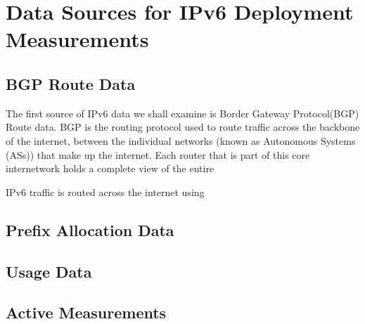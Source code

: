 \section{Data Sources for IPv6 Deployment Measurements}

\subsection{BGP Route Data}

The first source of IPv6 data we shall examine is Border Gateway Protocol(BGP)
Route data. BGP is the routing protocol used to route traffic across the backbone
of the internet, between the individual networks (known as Autonomous
Systems (ASs)) that make up the internet. Each router that is part of this core
internetwork holds a complete view of the entire

IPv6 traffic
is routed across the internet using 

\subsection{Prefix Allocation Data}

\subsection{Usage Data}

\subsection{Active Measurements}

